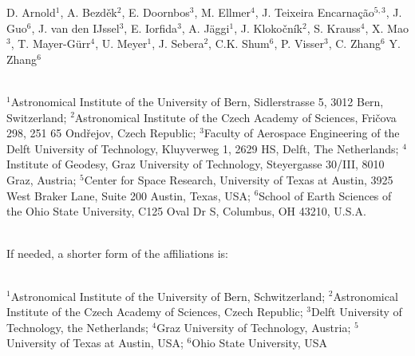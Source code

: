 \documentclass[11pt,a4paper,oneside]{article}
\begin{document}
D. Arnold$^1$, %
A. Bezd\v{e}k$^2$, %
E. Doornbos$^3$, %
M. Ellmer$^4$, %
J. Teixeira Encarna\c c\~ao$^{5,3}$, %
J. Guo$^6$, %
J. van den IJssel$^3$, %
E. Iorfida$^3$, %
A. J\"{a}ggi$^1$, %
J. Kloko\v{c}n\'{i}k$^2$, %
S. Krauss$^4$,
X. Mao$^3$, %
T. Mayer-G\"{u}rr$^4$, %
U. Meyer$^1$, %
J. Sebera$^2$, %
C.K. Shum$^6$, %
P. Visser$^3$, %
C. Zhang$^6$ %
Y. Zhang$^6$

~\\

$^1$Astronomical Institute of the University of Bern, Sidlerstrasse 5, 3012 Bern, Switzerland;
$^2$Astronomical Institute of the Czech Academy of Sciences, Fri\v{c}ova 298, 251 65 Ond\v{r}ejov, Czech Republic;
$^3$Faculty of Aerospace Engineering of the Delft University of Technology, Kluyverweg 1, 2629 HS, Delft, The Netherlands;
$^4$Institute of Geodesy, Graz University of Technology, Steyergasse 30/III, 8010 Graz, Austria;
$^5$Center for Space Research, University of Texas at Austin, 3925 West Braker Lane, Suite 200 Austin, Texas, USA;
$^6$School of Earth Sciences of the Ohio State University, C125 Oval Dr S, Columbus, OH 43210, U.S.A.

~\\

If needed, a shorter form of the affiliations is:

~\\

$^1$Astronomical Institute of the University of Bern, Schwitzerland;
$^2$Astronomical Institute of the Czech Academy of Sciences, Czech Republic;
$^3$Delft University of Technology, the Netherlands;
$^4$Graz University of Technology, Austria;
$^5$University of Texas at Austin, USA;
$^6$Ohio State University, USA
\end{document}
